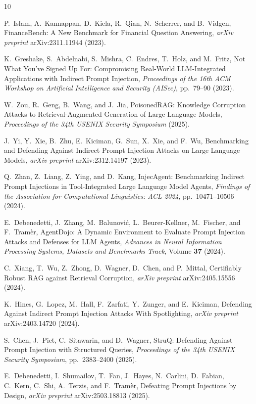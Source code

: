 \documentclass[10pt,letterpaper]{article}
\begin{document}
\begin{thebibliography}{10}
\setlength{\itemsep}{2pt}
\small

P.~Islam, A.~Kannappan, D.~Kiela, R.~Qian, N.~Scherrer, and B.~Vidgen, FinanceBench: A New Benchmark for Financial
Question Answering, \emph{arXiv preprint} arXiv:2311.11944 (2023).

K.~Greshake, S.~Abdelnabi, S.~Mishra, C.~Endres, T.~Holz, and M.~Fritz, Not What You've Signed Up For: Compromising
Real-World LLM-Integrated Applications with Indirect Prompt Injection, \emph{Proceedings of the 16th ACM Workshop on
Artificial Intelligence and Security (AISec)}, pp.~79--90 (2023).

W.~Zou, R.~Geng, B.~Wang, and J.~Jia, PoisonedRAG: Knowledge Corruption Attacks to Retrieval-Augmented Generation of
Large Language Models, \emph{Proceedings of the 34th USENIX Security Symposium} (2025).

J.~Yi, Y.~Xie, B.~Zhu, E.~Kiciman, G.~Sun, X.~Xie, and F.~Wu, Benchmarking and Defending Against Indirect Prompt
Injection Attacks on Large Language Models, \emph{arXiv preprint} arXiv:2312.14197 (2023).

Q.~Zhan, Z.~Liang, Z.~Ying, and D.~Kang, InjecAgent: Benchmarking Indirect Prompt Injections in Tool-Integrated Large
Language Model Agents, \emph{Findings of the Association for Computational Linguistics: ACL 2024},
pp.~10471--10506 (2024).

E.~Debenedetti, J.~Zhang, M.~Balunovi\'{c}, L.~Beurer-Kellner, M.~Fischer, and F.~Tram\`{e}r, AgentDojo: A Dynamic
Environment to Evaluate Prompt Injection Attacks and Defenses for LLM Agents, \emph{Advances in Neural Information
Processing Systems, Datasets and Benchmarks Track}, Volume \textbf{37} (2024).

C.~Xiang, T.~Wu, Z.~Zhong, D.~Wagner, D.~Chen, and P.~Mittal, Certifiably Robust RAG against Retrieval Corruption,
\emph{arXiv preprint} arXiv:2405.15556 (2024).

K.~Hines, G.~Lopez, M.~Hall, F.~Zarfati, Y.~Zunger, and E.~Kiciman, Defending Against Indirect Prompt Injection
Attacks With Spotlighting, \emph{arXiv preprint} arXiv:2403.14720 (2024).

S.~Chen, J.~Piet, C.~Sitawarin, and D.~Wagner, StruQ: Defending Against Prompt Injection with Structured Queries,
\emph{Proceedings of the 34th USENIX Security Symposium}, pp.~2383--2400 (2025).

E.~Debenedetti, I.~Shumailov, T.~Fan, J.~Hayes, N.~Carlini, D.~Fabian, C.~Kern, C.~Shi, A.~Terzis, and
F.~Tram\`{e}r, Defeating Prompt Injections by Design, \emph{arXiv preprint} arXiv:2503.18813 (2025).

\end{thebibliography}
\end{document}
